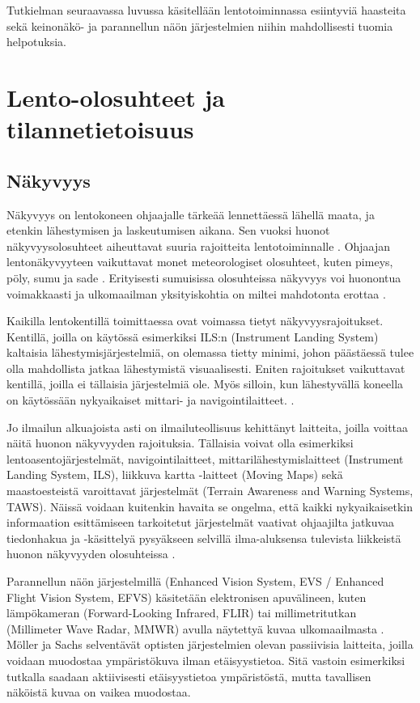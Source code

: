 \documentclass[utf8,bachelor,manualbib]{gradu3}
\begin{document}
Tutkielman seuraavassa luvussa käsitellään lentotoiminnassa esiintyviä haasteita sekä keinonäkö- ja parannellun näön järjestelmien niihin mahdollisesti tuomia helpotuksia.

\chapter{Lento-olosuhteet ja tilannetietoisuus}

\section{Näkyvyys}

Näkyvyys on lentokoneen ohjaajalle tärkeää lennettäessä lähellä maata, ja etenkin lähestymisen ja laskeutumisen aikana. Sen vuoksi huonot näkyvyysolosuhteet aiheuttavat suuria rajoitteita lentotoiminnalle \citep{mollersachs1994, prinzelym2013}. Ohjaajan lentonäkyvyyteen vaikuttavat monet meteorologiset olosuhteet, kuten pimeys, pöly, sumu ja sade \citep{wickensalexander2009}. Erityisesti sumuisissa olosuhteissa näkyvyys voi huonontua voimakkaasti ja ulkomaailman yksityiskohtia on miltei mahdotonta erottaa \citep{beiergemperlein2004}.

Kaikilla lentokentillä toimittaessa ovat voimassa tietyt näkyvyysrajoitukset. Kentillä, joilla on käytössä esimerkiksi ILS:n (Instrument Landing System) kaltaisia lähestymisjärjestelmiä, on olemassa tietty minimi, johon päästäessä tulee olla mahdollista jatkaa lähestymistä visuaalisesti. Eniten rajoitukset vaikuttavat kentillä, joilla ei tällaisia järjestelmiä ole. Myös silloin, kun lähestyvällä koneella on käytössään nykyaikaiset mittari- ja navigointilaitteet. \cite{mollersachs1994}.

Jo ilmailun alkuajoista asti on ilmailuteollisuus kehittänyt laitteita, joilla voittaa näitä huonon näkyvyyden rajoituksia. Tällaisia voivat olla esimerkiksi lentoasentojärjestelmät, navigointilaitteet, mittarilähestymislaitteet (Instrument Landing System, ILS), liikkuva kartta -laitteet (Moving Maps) sekä maastoesteistä varoittavat järjestelmät (Terrain Awareness and Warning Systems, TAWS). Näissä voidaan kuitenkin havaita se ongelma, että kaikki nykyaikaisetkin informaation esittämiseen tarkoitetut järjestelmät vaativat ohjaajilta jatkuvaa tiedonhakua ja -käsittelyä pysyäkseen selvillä ilma-aluksensa tulevista liikkeistä huonon näkyvyyden olosuhteissa \citep {prinzel2004}.

Parannellun näön järjestelmillä (Enhanced Vision System, EVS / Enhanced Flight Vision System, EFVS) käsitetään elektronisen apuvälineen, kuten lämpökameran (Forward-Looking Infrared, FLIR) tai millimetritutkan (Millimeter Wave Radar, MMWR) avulla näytettyä kuvaa ulkomaailmasta \citep{baileyym2007}. Möller ja Sachs \citeyearpar{mollersachs1994} selventävät optisten järjestelmien olevan passiivisia laitteita, joilla voidaan muodostaa ympäristökuva ilman etäisyystietoa. Sitä vastoin esimerkiksi tutkalla saadaan aktiivisesti etäisyystietoa ympäristöstä, mutta tavallisen näköistä kuvaa on vaikea muodostaa.
\end{document}
